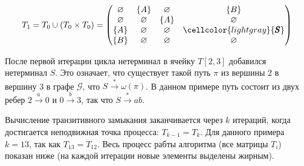 \begin{example}
\[
T_1 = T_0 \cup (T_0 \times T_0) = \begin{pmatrix}
    \varnothing & \{A\}       & \varnothing & \{B\}       \\
    \varnothing & \varnothing & \{A\}       & \varnothing \\
    \{A\}       & \varnothing & \varnothing & \cellcolor{lightgray} \{\pmb{S}\}       \\
    \{B\}       & \varnothing & \varnothing & \varnothing \\
\end{pmatrix}
\]

После первой итерации цикла нетерминал в ячейку $T[2,3]$ добавился нетерминал $S$. 
Это означает, что существует такой путь $\pi$ из вершины 2 в вершину 3 в графе $\mathcal{G}$, что $S \xrightarrow{*} \omega(\pi)$. В данном примере путь состоит из двух ребер $2 \xrightarrow{a} 0$ и $ 0 \xrightarrow{b} 3$, так что $S \xrightarrow{*} ab$.

Вычисление транзитивного замыкания заканчивается через $k$ итераций, когда достигается неподвижная точка процесса: $T_{k-1} = T_k$. Для данного примера $k = 13$, так как $T_{13} = T_{12}$. Весь процесс рабты алгоритма (все матрицы $T_i$) показан ниже (на каждой итерации новые элементы выделены жирным).


\end{example}
